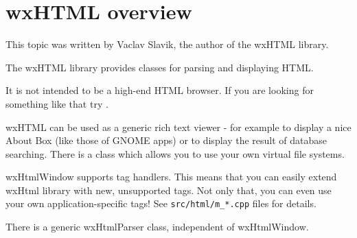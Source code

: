 \section{wxHTML overview}\label{wxhtml}

This topic was written by Vaclav Slavik, the author of the wxHTML library.

The wxHTML library provides classes for parsing and displaying HTML.

It is not intended to be a high-end HTML browser. If you are looking for
something like that try .

wxHTML can be used as a generic rich text viewer - for example to display 
a nice About Box (like those of GNOME apps) or to display the result of
database searching. There is a  
class which allows you to use your own virtual file systems.

wxHtmlWindow supports tag handlers. This means that you can easily
extend wxHtml library with new, unsupported tags. Not only that,
you can even use your own application-specific tags!
See \verb$src/html/m_*.cpp$ files for details.

There is a generic wxHtmlParser class,
independent of wxHtmlWindow.









